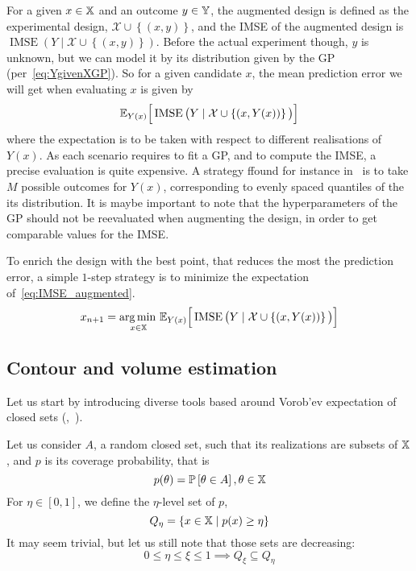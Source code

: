 \documentclass[../../Main_ManuscritThese.tex]{subfiles}
\newcommand{\IMSE}{\mathop{\mathrm{IMSE}}}
\begin{document}
For a given $x\in \mathbb{X}$ and an outcome $y\in\mathbb{Y}$, the augmented design is defined as the experimental design, $\mathcal{X} \cup \left\{(x, y)\right\}$, and the IMSE of the augmented design is $\IMSE\left(Y \mid \mathcal{X} \cup \left\{(x, y)\right\} \right)$. Before the actual experiment though, $y$ is unknown, but we can model it by its distribution given by the GP (per~\cref{eq:YgivenXGP}). So for a given candidate $x$, the mean prediction error we will get when evaluating $x$ is given by
\begin{equation}
  \label{eq:IMSE_augmented}
  \Ex_{Y(x)}\Big[\IMSE\big(Y \mid \mathcal{X} \cup \left\{(x, Y(x))\right\} \big)\Big]
\end{equation}
where the expectation is to be taken with respect to different realisations of $Y(x)$. As each scenario requires to fit a GP, and to compute the IMSE, a precise evaluation is quite expensive. A strategy ffound for instance in~\cite{villemonteix_informational_2006} is to take $M$ possible outcomes for $Y(x)$, corresponding to evenly spaced quantiles of the its distribution.
It is maybe important to note that the hyperparameters of the GP should not be reevaluated when augmenting the design, in order to get comparable values for the IMSE.

To enrich the design with the best point, that reduces the most the prediction error, a simple $1$-step strategy is to minimize the expectation of~\cref{eq:IMSE_augmented}.
\begin{equation}
  x_{n+1} = \argmin_{x\in \Xspace}\Ex_{Y(x)}\Big[\IMSE\big(Y \mid \mathcal{X} \cup \left\{(x, Y(x))\right\} \big)\Big]
\end{equation}



\subsection{Contour and volume estimation}
Let us start by introducing diverse tools based around Vorob'ev expectation of closed sets (\cite{el_amri_analyse_2019},~\cite{heinrich_level_2012}). 


Let us consider $A$, a random closed set, such that its realizations are subsets of $\mathbb{X}$, and $p$ is its coverage probability, that is
\begin{equation}
  p(\theta) = \mathbb{P}\left[\theta\in A\right], \theta\in\mathbb{X}
\end{equation}
For $\eta \in [0, 1]$, we define the $\eta$-level set of $p$,
\begin{equation}
  Q_{\eta} = \{x\in\mathbb{X} \mid p(x) \geq \eta \}
\end{equation}
It may seem trivial, but let us still note that those sets are decreasing:
\begin{equation}
  0\leq \eta \leq \xi \leq 1 \implies Q_{\xi} \subseteq Q_{\eta}
\end{equation}
\end{document}
